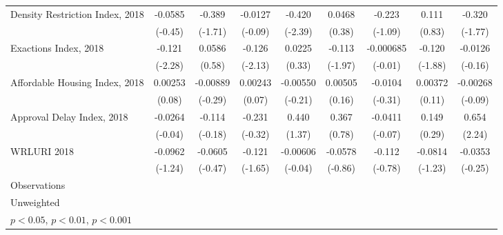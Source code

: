 \begin{table}[htbp]
\begin{tabular}{l*{8}{c}}
\addlinespace
Density Restriction Index, 2018&     -0.0585         &      -0.389         &     -0.0127         &      -0.420\sym{*}  &      0.0468         &      -0.223         &       0.111         &      -0.320         \\
                    &     (-0.45)         &     (-1.71)         &     (-0.09)         &     (-2.39)         &      (0.38)         &     (-1.09)         &      (0.83)         &     (-1.77)         \\
\addlinespace
Exactions Index, 2018&      -0.121\sym{*}  &      0.0586         &      -0.126\sym{*}  &      0.0225         &      -0.113\sym{*}  &   -0.000685         &      -0.120         &     -0.0126         \\
                    &     (-2.28)         &      (0.58)         &     (-2.13)         &      (0.33)         &     (-1.97)         &     (-0.01)         &     (-1.88)         &     (-0.16)         \\
\addlinespace
Affordable Housing Index, 2018&     0.00253         &    -0.00889         &     0.00243         &    -0.00550         &     0.00505         &     -0.0104         &     0.00372         &    -0.00268         \\
                    &      (0.08)         &     (-0.29)         &      (0.07)         &     (-0.21)         &      (0.16)         &     (-0.31)         &      (0.11)         &     (-0.09)         \\
\addlinespace
Approval Delay Index, 2018&     -0.0264         &      -0.114         &      -0.231         &       0.440         &       0.367         &     -0.0411         &       0.149         &       0.654\sym{*}  \\
                    &     (-0.04)         &     (-0.18)         &     (-0.32)         &      (1.37)         &      (0.78)         &     (-0.07)         &      (0.29)         &      (2.24)         \\
\addlinespace
WRLURI 2018         &     -0.0962         &     -0.0605         &      -0.121         &    -0.00606         &     -0.0578         &      -0.112         &     -0.0814         &     -0.0353         \\
                    &     (-1.24)         &     (-0.47)         &     (-1.65)         &     (-0.04)         &     (-0.86)         &     (-0.78)         &     (-1.23)         &     (-0.25)         \\
\midrule
Observations        &                     &                     &                     &                     &                     &                     &                     &                     \\
\bottomrule
\multicolumn{9}{l}{\footnotesize Unweighted}\\
\multicolumn{9}{l}{\footnotesize \sym{*} \(p<0.05\), \sym{**} \(p<0.01\), \sym{***} \(p<0.001\)}\\
\end{tabular}
\end{table}
